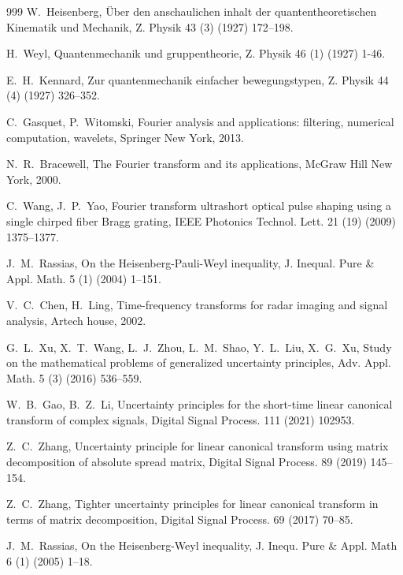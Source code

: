 \documentclass[preprint,12pt]{elsarticle}
\begin{document}
\begin{thebibliography}{999}
	W.~Heisenberg, {\"U}ber den anschaulichen inhalt der quantentheoretischen Kinematik und Mechanik, Z. Physik 43 (3) (1927) 172–198.
	
     H.~Weyl, Quantenmechanik und gruppentheorie, Z. Physik 46 (1) (1927) 1-46.
	
	E.~H.~Kennard, Zur quantenmechanik einfacher bewegungstypen, Z. Physik 44 (4) (1927) 326–352.
	
	C.~Gasquet, P.~Witomski, Fourier analysis and applications: filtering, numerical computation, wavelets, Springer New York, 2013.
	
	N.~R.~Bracewell, The Fourier transform and its applications, McGraw Hill New York, 2000.
	
	C.~Wang, J.~P.~Yao, Fourier transform ultrashort optical pulse shaping using a single chirped fiber Bragg grating, IEEE Photonics Technol. Lett. 21 (19) (2009) 1375–1377.
	
	J.~M.~Rassias, On the Heisenberg-Pauli-Weyl inequality, J. Inequal. Pure \& Appl. Math. 5 (1) (2004) 1–151.
	
	V.~C.~Chen, H.~Ling, Time-frequency transforms for radar imaging and signal analysis, Artech house, 2002.
	
	G.~L.~Xu, X.~T.~Wang, L.~J.~Zhou, L.~M.~Shao, Y.~L.~Liu, X.~G.~Xu, Study on the mathematical problems of generalized uncertainty principles, Adv. Appl. Math. 5 (3) (2016) 536–559.
	
	W.~B.~Gao, B.~Z.~Li, Uncertainty principles for the short-time linear canonical transform of complex signals, Digital Signal Process. 111 (2021) 102953.
	
	Z.~C.~Zhang, Uncertainty principle for linear canonical transform using matrix decomposition of absolute spread matrix, Digital Signal Process. 89 (2019) 145–154.
	
	Z.~C.~Zhang, Tighter uncertainty principles for linear canonical transform in terms of matrix decomposition, Digital Signal Process. 69 (2017) 70–85.
	
	J.~M.~Rassias, On the Heisenberg-Weyl inequality, J. Inequ. Pure \& Appl. Math 6 (1) (2005) 1–18.
	

\end{thebibliography}
\end{document}
